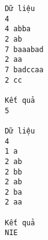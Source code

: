 \begin{verbatim}
Dữ liệu
4
4 abba
2 ab
7 baaabad
2 aa
7 badccaa
2 cc

Kết quả
5

Dữ liệu
4
1 a
2 ab
2 bb
2 ab
2 ba
2 aa

Kết quả
NIE
\end{verbatim}